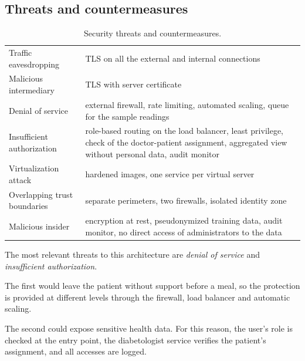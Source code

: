 \subsection{Threats and countermeasures}

\begin{table}[H]
\centering
\small
{}
\begin{tabularx}{\linewidth}{>{\raggedright\arraybackslash}p{3.8cm} Y}
\toprule
{}
 &  \\
\midrule
Traffic eavesdropping        & TLS on all the external and internal connections \\
Malicious intermediary       & TLS with server certificate\\
Denial of service            & external firewall, rate limiting, automated scaling,
                               queue for the sample readings \\
Insufficient authorization   & role-based routing on the load balancer, least privilege, check of the doctor-patient
                               assignment, aggregated view without personal data, audit monitor \\
Virtualization attack        & hardened images, one service per virtual server \\
Overlapping trust boundaries & separate perimeters, two firewalls, isolated identity zone \\
Malicious insider            & encryption at rest, pseudonymized training data, audit monitor, no direct access of administrators to the data \\
\bottomrule
\end{tabularx}
\caption{Security threats and countermeasures.}
\label{tab:threats}
\end{table}

The most relevant threats to this architecture are \textit{denial of service} and \textit{insufficient authorization}.

The first would leave the patient without support before a meal, so
the protection is provided at different levels through the firewall, load balancer and automatic scaling.

The second could expose sensitive health data. For this reason, the user's role is checked at the entry point, the diabetologist service verifies the patient's assignment, and all accesses are logged.